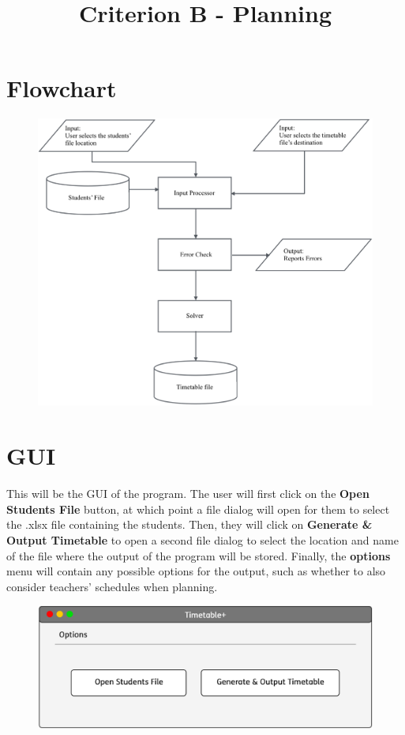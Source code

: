 \documentclass[12pt]{article}
\title{Criterion B - Planning}
\author{}
\date{}
\begin{document}
\maketitle

\section{Flowchart}
%
\begin{figure}[H]
    \centering
    \includegraphics[width=\textwidth]{system_flowchart}
\end{figure}
%
\section{GUI}

This will be the GUI of the program. The user will first click on the \textbf{Open Students
File} button, at which point a file dialog will open for them to select the .xlsx file
containing the students. Then, they will click on \textbf{Generate \& Output Timetable} to
open a second file dialog to select the location and name of the file where the output of
the program will be stored. Finally, the \textbf{options} menu will contain any possible
options for the output, such as whether to also consider teachers' schedules when planning. 
%
\begin{figure}[H]
    \centering
    \includegraphics[width=\textwidth]{interface_design}
\end{figure}
%
\end{document}
